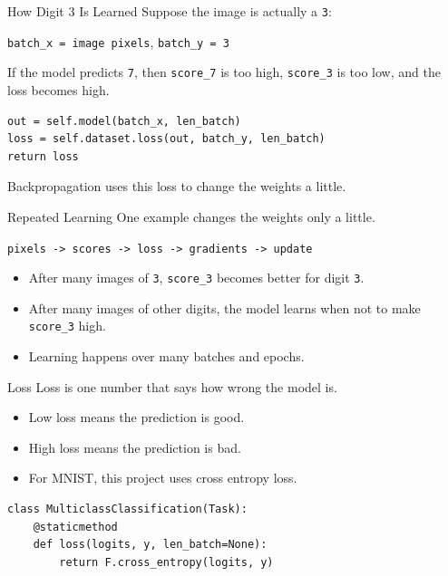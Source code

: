 \documentclass{beamer}
\begin{document}
\begin{frame}[fragile]{How Digit 3 Is Learned}
\small
Suppose the image is actually a \texttt{3}:

\begin{center}
\texttt{batch\_x = image pixels}, \qquad \texttt{batch\_y = 3}
\end{center}

If the model predicts \texttt{7}, then \texttt{score\_7} is too high,
\texttt{score\_3} is too low, and the loss becomes high.

\vspace{0.15cm}

\begin{verbatim}
out = self.model(batch_x, len_batch)
loss = self.dataset.loss(out, batch_y, len_batch)
return loss
\end{verbatim}

Backpropagation uses this loss to change the weights a little.
\end{frame}

\begin{frame}{Repeated Learning}
\small
One example changes the weights only a little.

\vspace{0.25cm}

\begin{center}
\texttt{pixels -> scores -> loss -> gradients -> update}
\end{center}

\vspace{0.25cm}

\begin{itemize}
    \item After many images of \texttt{3}, \texttt{score\_3} becomes better for digit \texttt{3}.
    \item After many images of other digits, the model learns when not to make \texttt{score\_3} high.
    \item Learning happens over many batches and epochs.
\end{itemize}
\end{frame}

\begin{frame}[fragile]{Loss}
\small
Loss is one number that says how wrong the model is.

\begin{itemize}
    \item Low loss means the prediction is good.
    \item High loss means the prediction is bad.
    \item For MNIST, this project uses cross entropy loss.
\end{itemize}

\vspace{0.15cm}

\begin{verbatim}
class MulticlassClassification(Task):
    @staticmethod
    def loss(logits, y, len_batch=None):
        return F.cross_entropy(logits, y)
\end{verbatim}
\end{frame}
\end{document}
